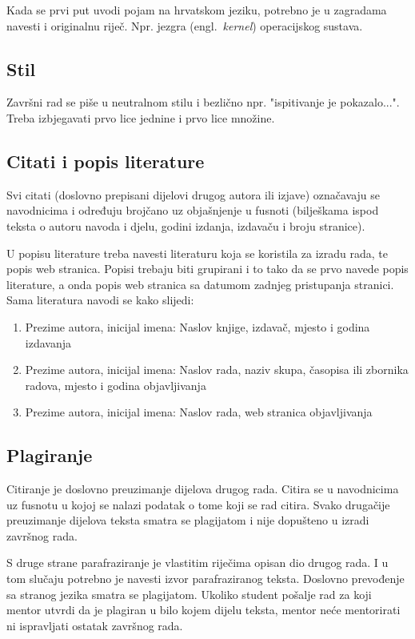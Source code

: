 Kada se prvi put uvodi pojam na hrvatskom jeziku, potrebno je u zagradama navesti i originalnu riječ. Npr. jezgra (engl.~\textit{kernel}) operacijskog sustava.  
\subsection{Stil}

Završni rad se piše u neutralnom stilu i bezlično npr. "ispitivanje je pokazalo...". 
Treba izbjegavati prvo lice jednine i prvo lice množine. 
\subsection{Citati i popis literature}

Svi citati (doslovno prepisani dijelovi drugog autora ili izjave) označavaju se navodnicima i
određuju brojčano uz objašnjenje u fusnoti (bilješkama ispod teksta o autoru navoda i djelu, godini izdanja, izdavaču i broju stranice).

U popisu literature treba navesti literaturu koja se koristila za izradu rada, te popis web stranica. Popisi trebaju biti 
grupirani i to tako da se prvo navede popis literature, a onda 
popis web stranica sa datumom zadnjeg pristupanja stranici.
Sama literatura navodi se kako slijedi:
\begin{enumerate}
\item 
Prezime autora, inicijal imena: Naslov knjige, izdavač, mjesto i godina izdavanja
\item Prezime autora, inicijal imena: Naslov rada, naziv skupa, časopisa ili zbornika radova,
mjesto i godina objavljivanja
\item Prezime autora, inicijal imena: Naslov rada, web stranica objavljivanja
\end{enumerate}

\subsection{Plagiranje}

Citiranje je doslovno preuzimanje dijelova drugog rada. Citira se u navodnicima uz fusnotu u kojoj se nalazi podatak o tome koji se rad citira. 
Svako drugačije preuzimanje dijelova teksta 
smatra se plagijatom i nije dopušteno u izradi završnog rada. 

S druge strane parafraziranje je vlastitim riječima opisan dio drugog rada. 
I u tom slučaju potrebno je navesti izvor 
parafraziranog teksta. Doslovno prevođenje sa stranog jezika smatra se plagijatom. Ukoliko student pošalje rad za koji mentor utvrdi da je plagiran u bilo kojem dijelu teksta, mentor neće mentorirati ni ispravljati ostatak završnog rada. 

